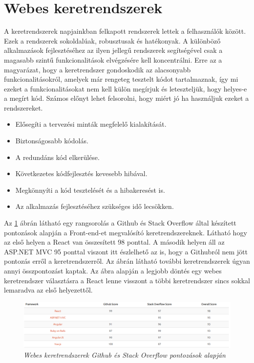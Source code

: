\section{Webes keretrendszerek}
A keretrendszerek \cite{frameworks} napjainkban felkapott rendszerek lettek a felhasználók között. Ezek a rendszerek sokoldalúak, robusztusak és hatékonyak. A különböző alkalmazások fejlesztéséhez az ilyen jellegű rendszerek segítségével csak a magasabb szintű funkcionalitások elvégzésére kell koncentrálni. Erre az a magyarázat, hogy a keretrendszer gondoskodik az alacsonyabb funkcionalitásokról, amelyek már rengeteg tesztelt kódot tartalmaznak, így mi ezeket a funkcionalitásokat nem kell külön megírjuk és leteszteljük, hogy helyes-e a megírt kód. Számos előnyt lehet felsorolni, hogy miért jó ha használjuk ezeket a rendszereket.
\begin{itemize}
	\item Elősegíti a tervezési minták megfelelő kialakítását.
	\item Biztonságosabb kódolás.
	\item A redundáns kód elkerülése.
	\item Következetes kódfejlesztés kevesebb hibával.
	\item Megkönnyíti a kód tesztelését és a hibakeresést is.
	\item Az alkalmazás fejlesztéséhez szükséges idő lecsökken.
\end{itemize}

Az \ref{fig:fornt_frameworks} ábrán látható egy rangsorolás a Github és Stack Overflow által készített pontozások alapján a Front-end-et megvalósító keretrendszereknek. Látható hogy az első helyen a React van összesített 98 ponttal. A második helyen áll az ASP.NET MVC 95 ponttal viszont itt észlelhető az is, hogy a Githubról nem jött pontozás erről a keretrendszerről. Az ábrán látható további keretrendszerek úgyan annyi összpontozást kaptak. Az ábra alapján a legjobb döntés egy webes keretrendszer választásra a React lenne visszont a többi keretrendszer sincs sokkal lemaradva az első helyezettől.
\begin{figure}[H]
	\centering
	\includegraphics[width=1\linewidth]{figures/images/vueang.png}
	\caption[Webes keretrendszerek Github és Stack Overflow pontozások alapján]{\textit{Webes keretrendszerek Github és Stack Overflow pontozások alapján}\footnotemark}
	\label{fig:fornt_frameworks}
\end{figure}


